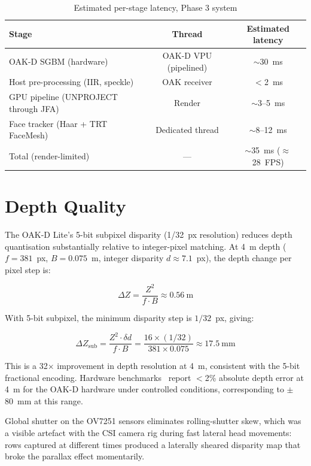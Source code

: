 \documentclass[11pt, a4paper]{report}
\begin{document}
\begin{table}[h]
\centering
\caption{Estimated per-stage latency, Phase 3 system}
\label{tab:latency}
\begin{tabular}{@{}lcc@{}}
\toprule
Stage & Thread & Estimated latency \\
\midrule
OAK-D SGBM (hardware)         & OAK-D VPU (pipelined) & $\sim$30~ms \\
Host pre-processing (IIR, speckle) & OAK receiver        & $<$2~ms \\
GPU pipeline (UNPROJECT through JFA) & Render            & $\sim$3--5~ms \\
Face tracker (Haar + TRT FaceMesh)  & Dedicated thread  & $\sim$8--12~ms \\
\midrule
Total (render-limited)        & ---                   & $\sim$35~ms ($\approx$28~FPS) \\
\bottomrule
\end{tabular}
\end{table}

\section{Depth Quality}

The OAK-D Lite's 5-bit subpixel disparity (1/32~px resolution) reduces
depth quantisation substantially relative to integer-pixel matching.
At 4~m depth ($f = 381$~px, $B = 0.075$~m, integer disparity
$d \approx 7.1$~px), the depth change per pixel step is:

\begin{equation}
    \Delta Z = \frac{Z^2}{f \cdot B} \approx 0.56~\mathrm{m}
\end{equation}

With 5-bit subpixel, the minimum disparity step is $1/32$~px, giving:

\begin{equation}
    \Delta Z_{\mathrm{sub}} = \frac{Z^2 \cdot \delta d}{f \cdot B} =
    \frac{16 \times (1/32)}{381 \times 0.075} \approx 17.5~\mathrm{mm}
\end{equation}

This is a 32$\times$ improvement in depth resolution at 4~m, consistent
with the 5-bit fractional encoding.
Hardware benchmarks~\cite{arxiv2501} report $<$2\% absolute depth error
at 4~m for the OAK-D hardware under controlled conditions, corresponding
to $\pm$80~mm at this range.

Global shutter on the OV7251 sensors eliminates rolling-shutter skew,
which was a visible artefact with the CSI camera rig during fast lateral
head movements: rows captured at different times produced a laterally
sheared disparity map that broke the parallax effect momentarily.
\end{document}

